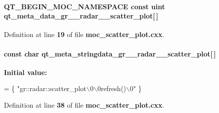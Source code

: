 \paragraph[{qt\+\_\+meta\+\_\+data\+\_\+gr\+\_\+\+\_\+radar\+\_\+\+\_\+scatter\+\_\+plot}]{\setlength{\rightskip}{0pt plus 5cm}Q\+T\+\_\+\+B\+E\+G\+I\+N\+\_\+\+M\+O\+C\+\_\+\+N\+A\+M\+E\+S\+P\+A\+CE const uint qt\+\_\+meta\+\_\+data\+\_\+gr\+\_\+\+\_\+radar\+\_\+\+\_\+scatter\+\_\+plot[$\,$]\hspace{0.3cm}{\ttfamily [static]}}\label{moc__scatter__plot_8cxx_ac2e792b88b395428209824f4929d534c}


Definition at line {\bf 19} of file {\bf moc\+\_\+scatter\+\_\+plot.\+cxx}.

\paragraph[{qt\+\_\+meta\+\_\+stringdata\+\_\+gr\+\_\+\+\_\+radar\+\_\+\+\_\+scatter\+\_\+plot}]{\setlength{\rightskip}{0pt plus 5cm}const char qt\+\_\+meta\+\_\+stringdata\+\_\+gr\+\_\+\+\_\+radar\+\_\+\+\_\+scatter\+\_\+plot[$\,$]\hspace{0.3cm}{\ttfamily [static]}}\label{moc__scatter__plot_8cxx_a5bbd99e93ab4f3646a226a4a4fcbae71}
{\bfseries Initial value\+:}
\begin{DoxyCode}
= \{
    \textcolor{stringliteral}{"gr::radar::scatter\_plot\(\backslash\)0\(\backslash\)0refresh()\(\backslash\)0"}
\}
\end{DoxyCode}


Definition at line {\bf 38} of file {\bf moc\+\_\+scatter\+\_\+plot.\+cxx}.

